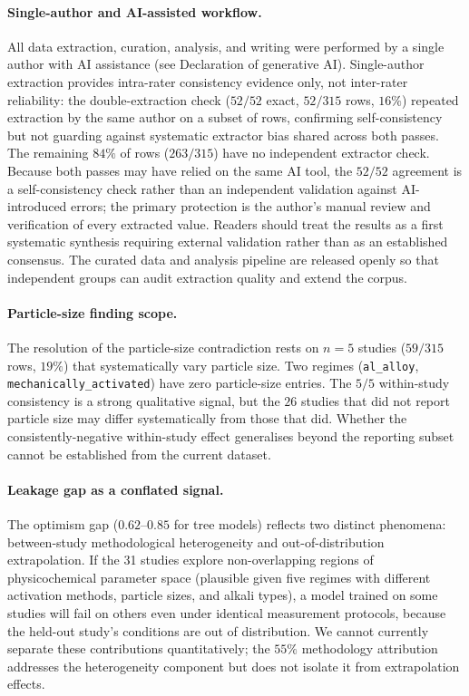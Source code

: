 \paragraph{Single-author and AI-assisted workflow.}
All data extraction, curation, analysis, and writing were performed by a single author
with AI assistance (see Declaration of generative AI). Single-author extraction provides
intra-rater consistency evidence only, not inter-rater reliability: the double-extraction
check ($52/52$ exact, $52/315$ rows, $16\%$) repeated extraction by the same author on a
subset of rows, confirming self-consistency but not guarding against systematic extractor
bias shared across both passes. The remaining $84\%$ of rows ($263/315$) have no
independent extractor check. Because both passes may have relied on the same AI tool,
the $52/52$ agreement is a self-consistency check rather than an independent validation
against AI-introduced errors; the primary protection is the author's manual review and
verification of every extracted value. Readers should treat the results as a first
systematic synthesis requiring external validation rather than as an established consensus.
The curated data and analysis pipeline are released openly so that independent groups can
audit extraction quality and extend the corpus.

\paragraph{Particle-size finding scope.}
The resolution of the particle-size contradiction rests on $n\!=\!5$ studies
($59/315$ rows, $19\%$) that systematically vary particle size. Two regimes
(\texttt{al\_alloy}, \texttt{mechanically\_activated}) have zero particle-size entries.
The $5/5$ within-study consistency is a strong qualitative signal, but the $26$ studies
that did not report particle size may differ systematically from those that did.
Whether the consistently-negative within-study effect generalises beyond the reporting
subset cannot be established from the current dataset.

\paragraph{Leakage gap as a conflated signal.}
The optimism gap ($0.62$--$0.85$ for tree models) reflects two distinct phenomena:
between-study methodological heterogeneity and out-of-distribution extrapolation.
If the 31 studies explore non-overlapping regions of physicochemical parameter
space (plausible given five regimes with different activation methods, particle sizes,
and alkali types), a model trained on some studies will fail on others even under
identical measurement protocols, because the held-out study's conditions are out of
distribution. We cannot currently separate these contributions quantitatively; the
$55\%$ methodology attribution addresses the heterogeneity component but does not
isolate it from extrapolation effects.

